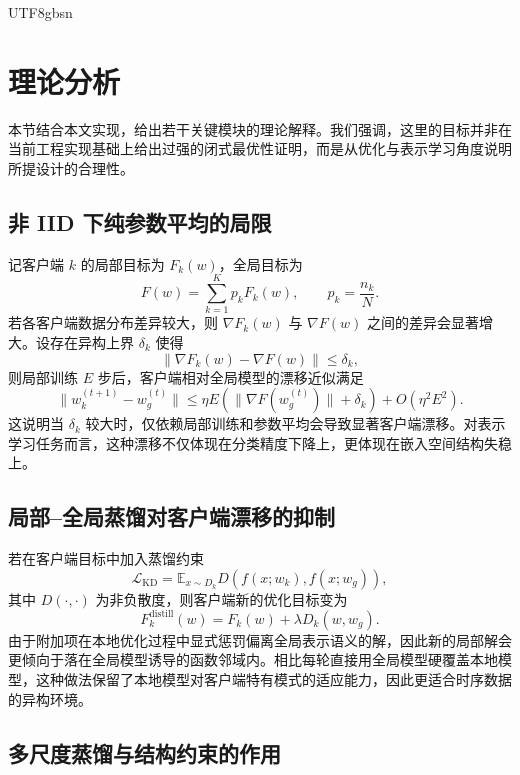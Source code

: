 \documentclass{article}
\begin{document}
\begin{CJK*}{UTF8}{gbsn}
\section{理论分析}

本节结合本文实现，给出若干关键模块的理论解释。我们强调，这里的目标并非在当前工程实现基础上给出过强的闭式最优性证明，而是从优化与表示学习角度说明所提设计的合理性。

\subsection{非 IID 下纯参数平均的局限}

记客户端 $k$ 的局部目标为 $F_k(w)$，全局目标为
\begin{equation}
F(w)=\sum_{k=1}^{K}p_k F_k(w),\qquad p_k=\frac{n_k}{N}.
\end{equation}
若各客户端数据分布差异较大，则 $\nabla F_k(w)$ 与 $\nabla F(w)$ 之间的差异会显著增大。设存在异构上界 $\delta_k$ 使得
\begin{equation}
\|\nabla F_k(w)-\nabla F(w)\|\leq \delta_k,
\end{equation}
则局部训练 $E$ 步后，客户端相对全局模型的漂移近似满足
\begin{equation}
\|w_k^{(t+1)}-w_g^{(t)}\|
\leq \eta E\left(\|\nabla F(w_g^{(t)})\|+\delta_k\right)
 + O(\eta^2E^2).
\end{equation}
这说明当 $\delta_k$ 较大时，仅依赖局部训练和参数平均会导致显著客户端漂移。对表示学习任务而言，这种漂移不仅体现在分类精度下降上，更体现在嵌入空间结构失稳上。

\subsection{局部--全局蒸馏对客户端漂移的抑制}

若在客户端目标中加入蒸馏约束
\begin{equation}
\mathcal{L}_{\text{KD}} = \mathbb{E}_{x\sim D_k} D\!\left(f(x;w_k), f(x;w_g)\right),
\end{equation}
其中 $D(\cdot,\cdot)$ 为非负散度，则客户端新的优化目标变为
\begin{equation}
F_k^{\text{distill}}(w)=F_k(w)+\lambda D_k(w,w_g).
\end{equation}
由于附加项在本地优化过程中显式惩罚偏离全局表示语义的解，因此新的局部解会更倾向于落在全局模型诱导的函数邻域内。相比每轮直接用全局模型硬覆盖本地模型，这种做法保留了本地模型对客户端特有模式的适应能力，因此更适合时序数据的异构环境。

\subsection{多尺度蒸馏与结构约束的作用}


\end{CJK*}
\end{document}

